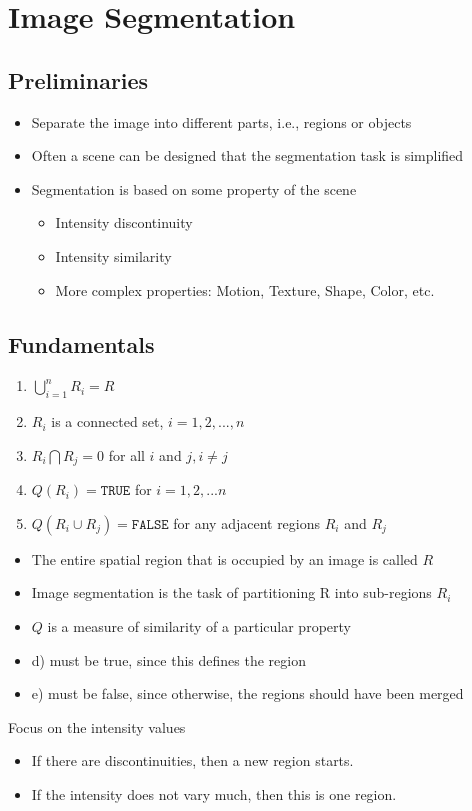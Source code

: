 \section{Image Segmentation}

\subsection{Preliminaries}

\begin{itemize}
	\item Separate the image into different parts, i.e., regions or objects
	\item Often a scene can be designed that the segmentation task is simplified
	\item Segmentation is based on some property of the scene
		\begin{itemize}
			\item Intensity discontinuity
			\item Intensity similarity
			\item More complex properties: Motion, Texture, Shape, Color, etc.
		\end{itemize}
\end{itemize}

\subsection{Fundamentals}

\begin{enumerate}[label={\alph*)}]
	\item $\bigcup\limits_{i=1}^{n}R_i=R$
	\item $R_i$ is a connected set, $i=1,2,...,n$
	\item $R_i\bigcap R_j = 0$ for all $i$ and $j, i\neq j$
	\item $Q(R_i)= \texttt{TRUE}$ for $i=1,2,...n$
	\item $Q(R_i\cup R_j)= \texttt{FALSE}$ for any adjacent regions $R_i$ and $R_j$
\end{enumerate}
\begin{itemize}
	\item The entire spatial region that is occupied by an image is called $R$
	\item Image segmentation is the task of partitioning R into sub-regions $R_i$
	\item $Q$ is a measure of similarity of a particular property
	\item d) must be true, since this defines the region
	\item e) must be false, since otherwise, the regions should have been merged
\end{itemize}
Focus on the intensity values
\begin{itemize}
	\item If there are discontinuities, then a new region starts.
	\item If the intensity does not vary much, then this is one region.
\end{itemize}

